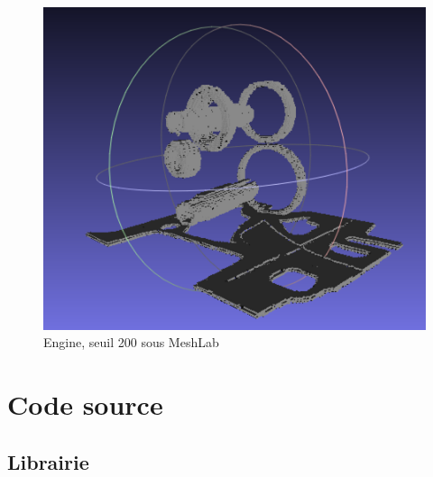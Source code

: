 \documentclass[a4paper,11pt]{article}
\begin{document}
\begin{figure}[H]
 \center
\includegraphics[scale=0.7]{engine_200_meshlab.png}
\caption{Engine, seuil 200 sous MeshLab}
\end{figure}

\paragraph{}

\section{Code source}

\subsection{Librairie}
\end{document}
